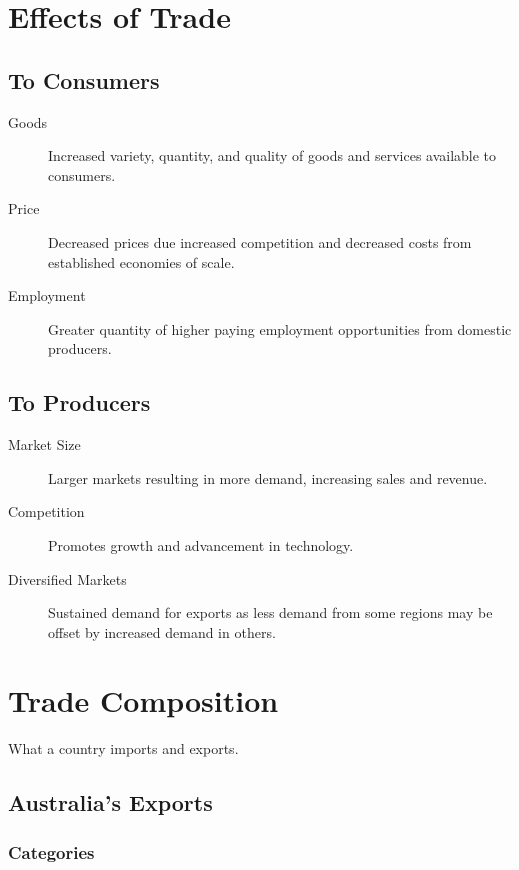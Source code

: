 \documentclass[a4paper,11pt]{report}
\begin{document}
\section{Effects of Trade}

\subsection{To Consumers}

\begin{description}
\item [Goods] Increased variety, quantity, and quality of goods and services
	available to consumers.
\item [Price] Decreased prices due increased competition and decreased costs
	from established economies of scale.
\item [Employment] Greater quantity of higher paying employment opportunities
	from domestic producers.
\end{description}

\subsection{To Producers}

\begin{description}
\item [Market Size] Larger markets resulting in more demand, increasing sales
	and revenue.
\item [Competition] Promotes growth and advancement in technology.
\item [Diversified Markets] Sustained demand for exports as less demand from
	some regions may be offset by increased demand in others.
\end{description}


\section{Trade Composition}

What a country imports and exports.

\subsection{Australia's Exports}

\subsubsection{Categories}
\end{document}
